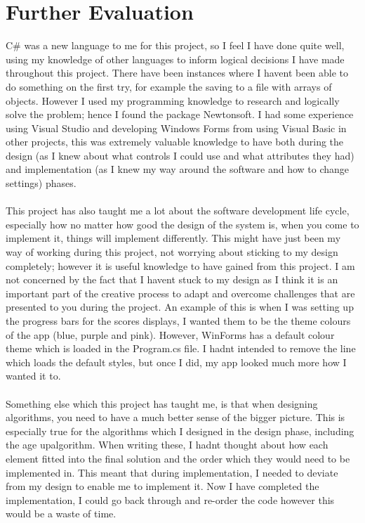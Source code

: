 \section{Further Evaluation}
C\# was a new language to me for this project, so I feel I have done quite well, using my knowledge of other languages to inform logical decisions I have made throughout this project. There have been instances where I haven\textquotesingle t been able to do something on the first try, for example the saving to a file with arrays of objects. However I used my programming knowledge to research and logically solve the problem; hence I found the package Newtonsoft. I had some experience using Visual Studio and developing Windows Forms from using Visual Basic in other projects, this was extremely valuable knowledge to have both during the design (as I knew about what controls I could use and what attributes they had) and implementation (as I knew my way around the software and how to change settings) phases.\\ \\
This project has also taught me a lot about the software development life cycle, especially how no matter how good the design of the system is, when you come to implement it, things will implement differently. This might have just been my way of working during this project, not worrying about sticking to my design completely; however it is useful knowledge to have gained from this project. I am not concerned by the fact that I haven\textquotesingle t stuck to my design as I think it is an important part of the creative process to adapt and overcome challenges that are presented to you during the project. An example of this is when I was setting up the progress bars for the scores displays, I wanted them to be the theme colours of the app (blue, purple and pink). However, WinForms has a default colour theme which is loaded in the Program.cs file. I hadn\textquotesingle t intended to remove the line which loads the default styles, but once I did, my app looked much more how I wanted it to.\\ \\
Something else which this project has taught me, is that when designing algorithms, you need to have a much better sense of the bigger picture. This is especially true for the algorithms which I designed in the design phase, including the \textquotesingle age up\textquotesingle  algorithm. When writing these, I hadn\textquotesingle t thought about how each element fitted into the final solution and the order which they would need to be implemented in. This meant that during implementation, I needed to deviate from my design to enable me to implement it. Now I have completed the implementation, I could go back through and re-order the code however this would be a waste of time.\\ \\
